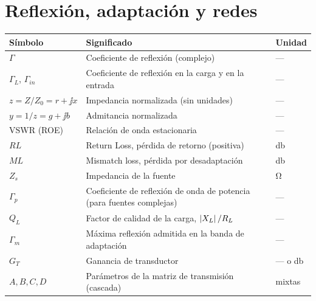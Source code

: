 \section*{Reflexión, adaptación y redes}
\begin{longtable}{@{}>{\centering\arraybackslash}p{2.6cm}p{9.6cm}p{2.4cm}@{}}
\toprule \textbf{Símbolo} & \textbf{Significado} & \textbf{Unidad}\\ \midrule\endhead
$\Gamma$ & Coeficiente de reflexión (complejo) & --- \\
$\Gamma_L$, $\Gamma_{in}$ & Coeficiente de reflexión en la carga y en la entrada & --- \\
$z = Z/Z_0 = r + \jj x$ & Impedancia normalizada (sin unidades) & --- \\
$y = 1/z = g + \jj b$ & Admitancia normalizada & --- \\
$\mathrm{VSWR}$ (ROE) & Relación de onda estacionaria & --- \\
$RL$ & Return Loss, pérdida de retorno (positiva) & \si{\decibel} \\
$ML$ & Mismatch loss, pérdida por desadaptación & \si{\decibel} \\
$Z_s$ & Impedancia de la fuente & \si{\ohm} \\
$\Gamma_p$ & Coeficiente de reflexión de onda de potencia (para fuentes complejas) & --- \\
$Q_L$ & Factor de calidad de la carga, $\left|X_L\right|/R_L$ & --- \\
$\Gamma_m$ & Máxima reflexión admitida en la banda de adaptación & --- \\
$G_T$ & Ganancia de transductor & --- o \si{\decibel} \\
$A, B, C, D$ & Parámetros de la matriz de transmisión (cascada) & mixtas \\
\bottomrule
\end{longtable}

